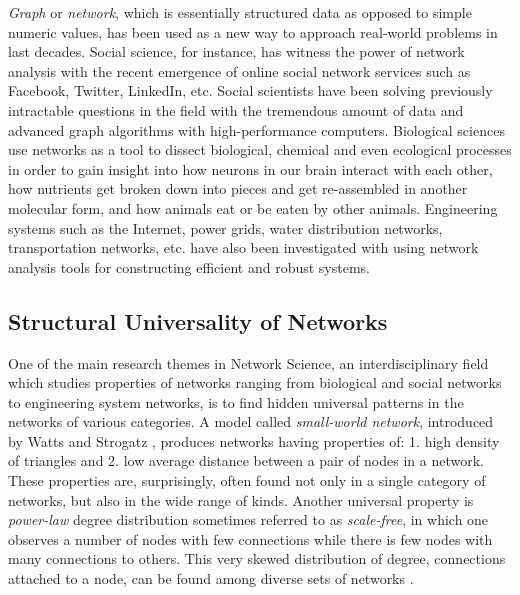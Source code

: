 \documentclass{article}
\begin{document}
	\textit{Graph} or \textit{network}, which is essentially structured data as opposed to simple numeric values, has been used as a new way to approach real-world problems in last decades. Social science, for instance, has witness the power of network analysis with the recent emergence of online social network services such as Facebook, Twitter, LinkedIn, etc.  Social scientists have been solving previously intractable questions in the field with the tremendous amount of  data and advanced graph algorithms with high-performance computers. Biological sciences use networks as a tool to dissect biological, chemical and even ecological processes in order to gain insight into how neurons in our brain interact with each other, how nutrients get broken down into pieces and get re-assembled in another molecular form, and how animals eat or be eaten by other animals. Engineering systems such as the Internet, power grids, water distribution networks, transportation networks, etc. have also been investigated with using network analysis tools for constructing efficient and robust systems. 
	
	
	\subsection{Structural Universality of Networks}
	
	One of the main research themes in Network Science, an interdisciplinary field which studies properties of networks ranging from biological and social networks to engineering system networks, is to find hidden universal patterns in the networks of various categories. A model called \textit{small-world network}, introduced by Watts and Strogatz \cite{watts1998cds}, produces networks having properties of: 1. high density of triangles and 2. low average distance between a pair of nodes in a network. These properties are, surprisingly, often found not only in a single category of networks, but also in the wide range of kinds. Another universal property is \textit{power-law} degree distribution sometimes referred to as \textit{scale-free}, in which one observes a number of nodes with few connections while there is few nodes with many connections to others. This very skewed distribution of degree, connections attached to a node, can be found among diverse sets of networks \cite{Barabasi99emergenceScaling}. 
\end{document}
